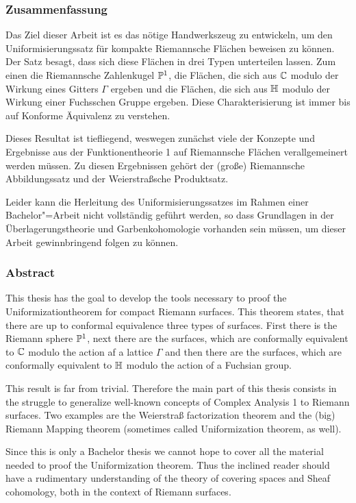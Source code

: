 
\subsubsection*{Zusammenfassung}
\label{sec:Zusammenfassung}

Das Ziel dieser Arbeit ist es das nötige Handwerkszeug zu
entwickeln, um den Uniformisierungssatz für kompakte Riemannsche
Flächen beweisen zu können. Der Satz besagt, dass sich diese
Flächen in drei Typen unterteilen lassen. Zum einen die Riemannsche
Zahlenkugel $\P^1$, die Flächen, die sich aus $\C$ modulo der
Wirkung eines Gitters $\Gamma$ ergeben und die Flächen, die sich aus
$\h$ modulo der Wirkung einer Fuchsschen Gruppe
ergeben. Diese Charakterisierung ist immer bis auf Konforme
Äquivalenz zu verstehen.

Dieses Resultat ist tiefliegend, weswegen zunächst viele der
Konzepte und Ergebnisse aus der Funktionentheorie 1 auf
Riemannsche Flächen verallgemeinert werden müssen. Zu diesen
Ergebnissen gehört der (große) Riemannsche Abbildungssatz und der
Weierstraßsche Produktsatz.

Leider kann die Herleitung des Uniformisierungssatzes im Rahmen
einer Bachelor"=Arbeit nicht vollständig geführt werden, so dass
Grundlagen in der Überlagerungstheorie und Garbenkohomologie
vorhanden sein müssen, um dieser Arbeit gewinnbringend folgen zu können.

\subsubsection*{Abstract}
\label{sec:abstract}

This thesis has the goal to develop the tools necessary to proof the
Uniformizationtheorem for compact Riemann surfaces. This theorem
states, that there are up to conformal equivalence three types of
surfaces. First there is the Riemann sphere $\P^1$, next there are the
surfaces, which are conformally equivalent to $\C$ modulo the action
af a lattice $\Gamma$ and then there are the surfaces, which are
conformally equivalent to $\h$ modulo the action of a Fuchsian group.


This result is far from trivial. Therefore the main part of this
thesis consists in the struggle to generalize well-known concepts of
Complex Analysis 1 to Riemann surfaces. Two examples are the
Weierstraß factorization theorem and the (big) Riemann Mapping theorem
(sometimes called Uniformization theorem, as well).

Since this is only a Bachelor thesis we cannot hope to cover all the
material needed to proof the Uniformization theorem. Thus the inclined
reader should have a rudimentary understanding of the theory of
covering spaces and Sheaf cohomology, both in the context of Riemann surfaces.

